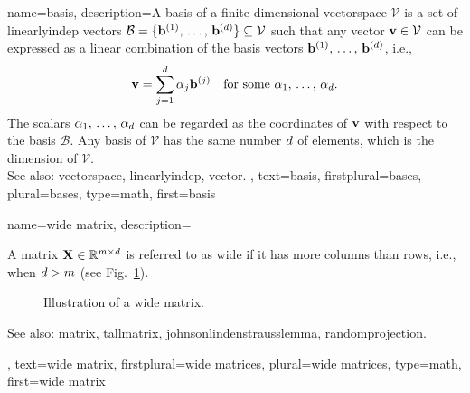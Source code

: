 {name={basis},
	description={A basis of a finite-dimensional \gls{vectorspace} $\mathcal{V}$ 
		is a set of \gls{linearlyindep} \glspl{vector} $\mathcal{B} = \{{\bf b}^{(1)}, \,\ldots, \,{\bf b}^{(d)}\} 
                 \subseteq \mathcal{V}$ such that any \gls{vector} ${\bf v} \in \mathcal{V}$ 
		can be expressed as a linear combination of the basis \glspl{vector} ${\bf b}^{(1)}, \,\ldots, \,{\bf b}^{(d)}$, i.e.,	
		$$ {\bf v} = \sum_{j=1}^{d} \alpha_{j} {\bf b}^{(j)}
			\quad \text{for some } \alpha_{1}, \,\ldots, \,\alpha_{d}. $$
                 The  scalars $\alpha_{1}, \,\ldots, \,\alpha_{d} $ can be regarded 
		as the coordinates of ${\bf v}$ with respect to the basis $\mathcal{B}$. 
		Any basis of $\mathcal{V}$ has the same number $d$ of elements, 
		which is the \gls{dimension} of $\mathcal{V}$.
			\\
		See also: \gls{vectorspace}, \gls{linearlyindep}, \gls{vector}. },
	text={basis}, 
	firstplural={bases}, 
	plural={bases}, 
	type=math,
	first={basis} 
}

{name={wide matrix},
	description={A \gls{matrix} 
   		${\bf X} \in \mathbb{R}^{m \times d}$ 
		is referred to as wide if it has more columns than rows, 
		i.e., when $d > m$ (see Fig.\ \ref{fig_widematrix_dict}).
		\begin{figure}[H]
			\centering
		\caption{Illustration of a wide \gls{matrix}. \label{fig_widematrix_dict}}
		\end{figure}
		See also: \gls{matrix}, \gls{tallmatrix}, \gls{johnsonlindenstrausslemma}, \gls{randomprojection}. },
	text={wide matrix}, 
	firstplural={wide matrices}, 
	plural={wide matrices}, 
	type=math,
   	first={wide matrix} 
}

